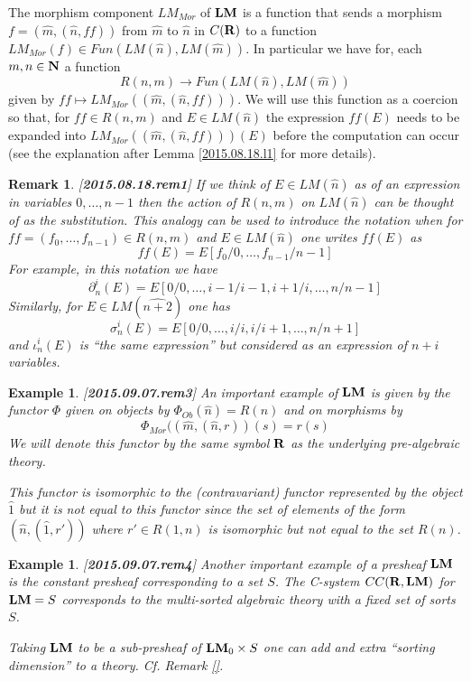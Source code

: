 \documentclass[11pt]{article}
\newtheorem{example}[proposition]{Example}
\newtheorem{remark}[proposition]{Remark}
\newcommand{\llabel}[1]{\label{#1}[{\bf #1}]}
\newcommand{\sr}{\rightarrow}
\newcommand{\nn}{{\bf N\rm}}
\newcommand{\nat}{\nn}
\newcommand{\rr}{{\bf R}}
\newcommand{\lm}{{\bf LM}}
\newcommand{\wh}{\widehat}
\begin{document}
The morphism component $LM_{Mor}$ of $\lm$ is a function that sends a morphism $f=(\wh{m},(\wh{n},ff))$ from $\wh{m}$ to $\wh{n}$ in $C(\rr)$ to a function $LM_{Mor}(f)\in Fun(LM(\wh{n}),LM(\wh{m}))$. In particular we have for, each $m,n\in\nat$ a function
%
$$R(n,m)\sr Fun(LM(\wh{n}),LM(\wh{m}))$$
%
given by $ff\mapsto LM_{Mor}((\wh{m},(\wh{n},ff)))$. We will use this function as a coercion so that, for $ff\in R(n,m)$ and $E\in LM(\wh{n})$ the expression $ff(E)$ needs to be expanded into $LM_{Mor}((\wh{m},(\wh{n},ff)))(E)$ before the computation can occur (see the explanation after Lemma \ref{2015.08.18.l1} for more details). 
\begin{remark}\rm
\llabel{2015.08.18.rem1}
If we think of $E\in LM(\wh{n})$ as of an expression in variables $0,\dots,n-1$ then the action of $R(n,m)$ on $LM(\wh{n})$ can be thought of as the substitution. This analogy can be used to introduce the notation when for $ff=(f_0,\dots,f_{n-1})\in R(n,m)$ and $E\in LM(\wh{n})$ one writes $ff(E)$ as 
%
$$ff(E)=E[f_0/0,\dots,f_{n-1}/n-1]$$
%
For example, in this notation we have 
%
$$\partial^i_n(E)=E[0/0,\dots,i-1/i-1,i+1/i,\dots,n/n-1]$$
%
Similarly, for $E\in LM(\wh{n+2})$ one has
%
$$\sigma^i_n(E)=E[0/0,\dots,i/i,i/i+1,\dots,n/n+1]$$
%
and $\iota_n^i(E)$ is ``the same expression'' but considered as an expression of $n+i$ variables.
\end{remark}
%
\begin{example}\rm
\llabel{2015.09.07.rem3}
An important example of $\lm$ is given by the functor $\Phi$ given on objects by $\Phi_{Ob}(\wh{n})=R(n)$ and on morphisms by 
%
$$\Phi_{Mor}((\wh{m},(\wh{n},r))(s)=r(s)$$
%
We will denote this functor by the same symbol $\rr$ as the underlying pre-algebraic theory.

This functor is isomorphic to the (contravariant) functor represented by the object $\wh{1}$ but it is not equal to this functor since the set of elements of the form  $(\wh{n},(\wh{1},r'))$ where $r'\in R(1,n)$ is isomorphic but not equal to the set $R(n)$.
\end{example}
%
%
\begin{example}\rm
\llabel{2015.09.07.rem4}
Another important example of a presheaf $\lm$ is the constant presheaf corresponding to a set $S$. The C-system $CC(\rr,\lm)$ for $\lm=S$ corresponds to the multi-sorted algebraic theory with a fixed set of sorts $S$. 

Taking $\lm$ to be a sub-presheaf of $\lm_0\times S$ one can add and extra ``sorting dimension'' to a theory. Cf. Remark \ref{}. 
\end{example}
\end{document}
